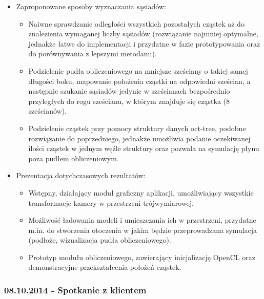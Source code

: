 \documentclass[polish, 12pt]{aghthesis}
\begin{document}
			\begin{itemize}
			
				\item Zaproponowane sposoby wyznaczania sąsiadów:
				
					\begin{itemize}
					
						\item Naiwne sprawdzanie odległości wszystkich pozostałych cząstek aż do znalezienia wymaganej liczby sąsiadów (rozwiązanie najmniej optymalne, jednakże łatwe do implementacji i przydatne w fazie prototypowania oraz do porównywania z lepszymi metodami).
						\item Podzielenie pudła obliczeniowego na mniejsze sześciany o takiej samej długości boku, mapowanie położenia cząstki na odpowiedni sześcian, a następnie szukanie sąsiadów jedynie w sześcianach bezpośrednio przyległych do rogu sześcianu, w którym znajduje się cząstka (8 sześcianów).
						\item Podzielenie cząstek przy pomocy struktury danych oct-tree, podobne rozwiązanie do poprzedniego, jednakże umożliwia podanie oczekiwanej ilości cząstek w jednym węźle struktury oraz pozwala na symulację płynu poza pudłem obliczeniowym.
					
					\end{itemize}
					
				\item Prezentacja dotychczasowych rezultatów:
				
					\begin{itemize}
					
						\item Wstępny, działający moduł graficzny aplikacji, umożliwiający wszystkie transformacje kamery w przestrzeni trójwymiarowej.
						\item Możliwość ładowania modeli i umieszczania ich w przestrzeni, przydatne m.in. do stworzenia otoczenia w jakim będzie przeprowadzana symulacja (podłoże, wizualizacja pudła obliczeniowego).
						\item Prototyp modułu obliczeniowego, zawierający inicjalizację OpenCL oraz demonstracyjne przekształcenia położeń cząstek.
					
					\end{itemize}
			
			\end{itemize}
		
		\subsubsection*{08.10.2014 - Spotkanie z klientem}
			
\end{document}
